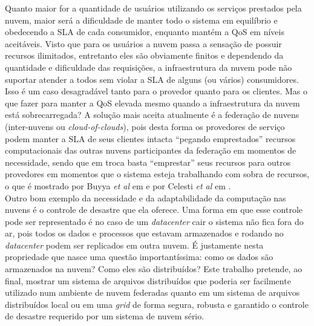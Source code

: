 Quanto maior for a quantidade de usuários utilizando os serviços prestados pela nuvem, maior será a dificuldade de manter todo o sistema em equilíbrio e obedecendo a SLA de cada consumidor, enquanto mantém a QoS em níveis aceitáveis. Visto que para os usuários a nuvem passa a sensação de possuir recursos ilimitados, entretanto eles são obviamente finitos e dependendo da quantidade e dificuldade das requisições, a infraestrutura da nuvem pode não suportar atender a todos sem violar a SLA de alguns (ou vários) consumidores. Isso é um caso desagradável tanto para o provedor quanto para os clientes. Mas o que fazer para manter a QoS elevada mesmo quando a infraestrutura da nuvem está sobrecarregada? A solução mais aceita atualmente é a federação de nuvens (inter-nuvens ou \textit{cloud-of-clouds}), pois desta forma os provedores de serviço podem manter a SLA de seus clientes intacta “pegando emprestados” recursos computacionais das outras nuvens participantes da federação em momentos de necessidade, sendo que em troca basta “emprestar” seus recursos para outros provedores em momentos que o sistema esteja trabalhando com sobra de recursos, o que é mostrado por Buyya \textit{et al} em \cite{buyya2} e por Celesti \textit{et al} em \cite{celesti1}.\\

Outro bom exemplo da necessidade e da adaptabilidade da computação nas nuvens é o controle de desastre que ela oferece. Uma forma em que esse controle pode ser representado é no caso de um \textit{datacenter} cair o sistema não fica fora do ar, pois todos os dados e processos que estavam armazenados e rodando no \textit{datacenter} podem ser replicados em outra nuvem. É justamente nesta propriedade que nasce uma questão importantíssima: como os dados são armazenados na nuvem? Como eles são distribuídos? Este trabalho pretende, ao final, mostrar um sistema de arquivos distribuídos que poderia ser facilmente utilizado num ambiente de nuvem federadas quanto em um sistema de arquivos distribuídos local ou em uma \textit{grid} de forma segura, robusta e garantido o controle de desastre requerido por um sistema de nuvem sério.\\
	
